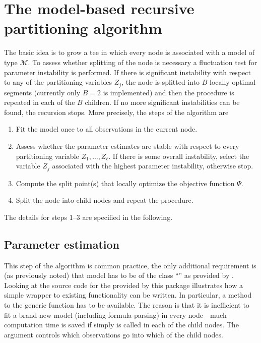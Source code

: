 \documentclass{Z}
\begin{document}
\section{The model-based recursive partitioning algorithm}
\label{sec:algorithm}

The basic idea is to grow a tee in which every node is associated with a model
of type $\mathcal{M}$. To assess whether splitting of the node is necessary a
fluctuation test for parameter instability is performed. If there is significant instability
with respect to any of the partitioning variables $Z_j$, the node is splitted
into $B$ locally optimal segments (currently only $B = 2$ is implemented)
and then the procedure is repeated in each of the $B$ children.
If no more significant instabilities can be found, the recursion stops.
More precisely, the steps of the algorithm are

\begin{enumerate}
\item Fit the model once to all observations in the current node.
\item Assess whether the parameter estimates are stable with respect to
  every partitioning variable $Z_1, \dots, Z_\ell$. If there is some overall instability,
  select the variable $Z_j$ associated with the highest parameter instability, otherwise
  stop.
\item Compute the split point(s) that locally optimize the objective function $\Psi$.
\item Split the node into child nodes and repeat the procedure.
\end{enumerate}

The details for steps 1--3 are specified in the following.


\subsection{Parameter estimation}

This step of the algorithm is common practice, the only additional 
requirement is (as previously noted) that model has to be of the class
``'' as provided by . Looking at the source
code for the  provided by this package illustrates how
a simple wrapper to existing  functionality can be written.
In particular, a method to the generic function  has to
be available. The reason is that it is inefficient to fit a brand-new model
 (including formula-parsing) in every node---much computation time
is saved if simply  is called in each of the
child nodes. The  argument controls which observations go into which
of the child nodes.
\end{document}
